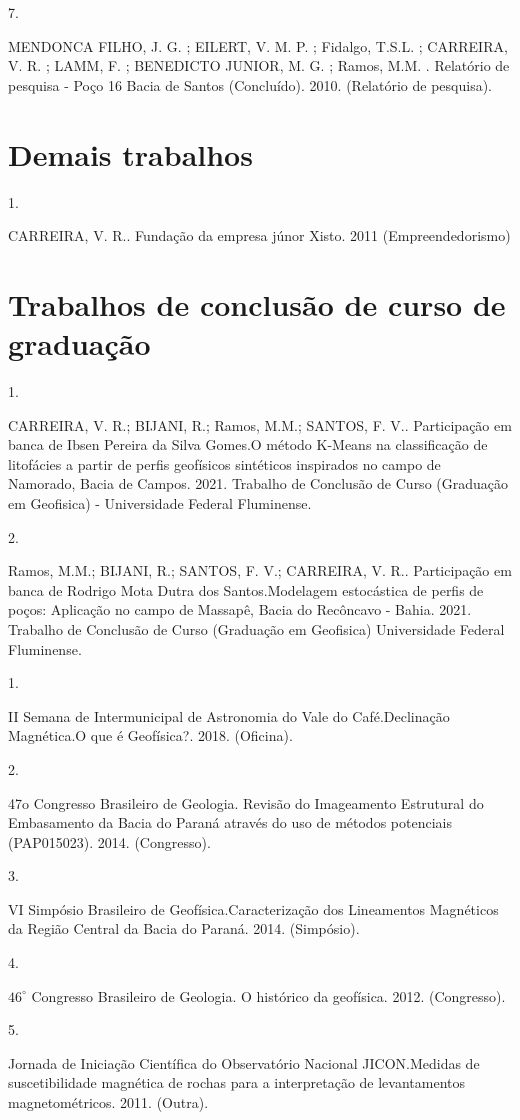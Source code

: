 \documentclass[10pt]{article}
\begin{document}
7.

MENDONCA FILHO, J. G. ; EILERT, V. M. P. ; Fidalgo, T.S.L. ; CARREIRA, V. R. ; LAMM, F. ; BENEDICTO JUNIOR, M. G. ; Ramos, M.M. . Relatório de pesquisa - Poço 16 Bacia de Santos (Concluído). 2010. (Relatório de pesquisa).

\section*{Demais trabalhos}
1.

CARREIRA, V. R.. Fundação da empresa júnor Xisto. 2011 (Empreendedorismo)

\section*{Trabalhos de conclusão de curso de graduação}
1.

CARREIRA, V. R.; BIJANI, R.; Ramos, M.M.; SANTOS, F. V.. Participação em banca de Ibsen Pereira da Silva Gomes.O método K-Means na classificação de litofácies a partir de perfis geofísicos sintéticos inspirados no campo de Namorado, Bacia de Campos. 2021. Trabalho de Conclusão de Curso (Graduação em Geofisica) - Universidade Federal Fluminense.

2.

Ramos, M.M.; BIJANI, R.; SANTOS, F. V.; CARREIRA, V. R.. Participação em banca de Rodrigo Mota Dutra dos Santos.Modelagem estocástica de perfis de poços: Aplicação no campo de Massapê, Bacia do Recôncavo - Bahia. 2021. Trabalho de Conclusão de Curso (Graduação em Geofisica) Universidade Federal Fluminense.

1.

II Semana de Intermunicipal de Astronomia do Vale do Café.Declinação Magnética.O que é Geofísica?. 2018. (Oficina).

2.

47o Congresso Brasileiro de Geologia. Revisão do Imageamento Estrutural do Embasamento da Bacia do Paraná através do uso de métodos potenciais (PAP015023). 2014. (Congresso).

3.

VI Simpósio Brasileiro de Geofísica.Caracterização dos Lineamentos Magnéticos da Região Central da Bacia do Paraná. 2014. (Simpósio).

4.

$46^{\circ}$ Congresso Brasileiro de Geologia. O histórico da geofísica. 2012. (Congresso).

5.

Jornada de Iniciação Científica do Observatório Nacional JICON.Medidas de suscetibilidade magnética de rochas para a interpretação de levantamentos magnetométricos. 2011. (Outra).
\end{document}
